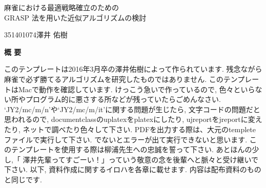 \begin{center}
{\LARGE 麻雀における最適戦略確立のための\\GRASP 法を用いた近似アルゴリズムの検討}\\[0.5cm]
\end{center}
\hfill
{\large 351401074\qquad 澤井 佑樹}\\[0.5cm]
\begin{center}
{\Large \bf 概 要}\\
\end{center}

このテンプレートは2016年3月卒の澤井佑樹によって作られています. 
残念ながら麻雀で必ず勝てるアルゴリズムを研究したものではありません. 
このテンプレートはMacで動作を確認しています. 
けっこう急いで作っているので, 色々といらない所やプログラム的に悪さする所などが残っていたらごめんなさい. 
`JY2/mc/m/n'や`JY2/mc/m/it'に関する問題が生じたら, 文字コードの問題だと思われるので, 
documentclassのuplatexをplatexにしたり, ujreportをjreportに変えたり, ネットで調べたり色々して下さい. 
PDFを出力する際は、大元のtempleteファイルで実行して下さい. 
でないとエラーが出て実行できないと思います. 
このテンプレートを使用する際は柳浦先生への忠誠を誓って下さい.
あとほんの少し,「 澤井先輩ってすごーい！」っていう敬意の念を後輩へと脈々と受け継いで下さい.
以下, 資料作成に関するイロハを各章に載せます. 
内容は配布資料のものと同じです. 
